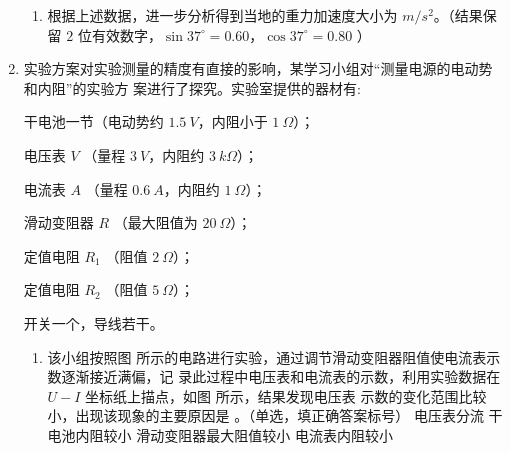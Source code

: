 \begin{enumerate}
\begin{enumerate}
\item 
根据上述数据，进一步分析得到当地的重力加速度大小为 \underlinegap $ m/s^{2} $。（结果保留 $ 2 $ 位有效数字，$ \sin 37 ^{ \circ } =0.60 $，$ \cos 37 ^{ \circ } =0.80 $ ）


\end{enumerate}








\item
实验方案对实验测量的精度有直接的影响，某学习小组对“测量电源的电动势和内阻”的实验方
案进行了探究。实验室提供的器材有:

干电池一节（电动势约 $ 1.5 \ V $，内阻小于 $ 1 \ \Omega $）；


电压表 $ V $ （量程 $ 3 \ V $，内阻约 $ 3 \ k\Omega $）；


电流表 $ A $ （量程 $ 0.6 \ A $，内阻约 $ 1 \ \Omega $）；


滑动变阻器 $ R $ （最大阻值为 $ 20 \ \Omega $）；


定值电阻 $ R_{1} $ （阻值 $ 2 \ \Omega $）；


定值电阻 $ R_{2} $ （阻值 $ 5 \ \Omega $）；

开关一个，导线若干。

\begin{enumerate}
\item
该小组按照图  所示的电路进行实验，通过调节滑动变阻器阻值使电流表示数逐渐接近满偏，记
录此过程中电压表和电流表的示数，利用实验数据在 $ U-I $ 坐标纸上描点，如图  所示，结果发现电压表
示数的变化范围比较小，出现该现象的主要原因是 \underlinegap 。（单选，填正确答案标号）
\fourchoices
{电压表分流}
{干电池内阻较小}
{滑动变阻器最大阻值较小}
{电流表内阻较小}
\begin{figure}[h!]
\centering
\begin{subfigure}{0.4\linewidth}
\centering
 
\caption{}\label{2020:山东:14a}
\end{subfigure}
\begin{subfigure}{0.5\linewidth}
\centering
{}
\end{subfigure}
\end{figure}
\end{enumerate}
\end{enumerate}
